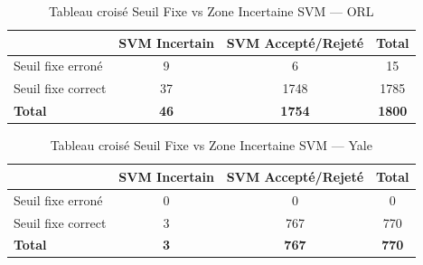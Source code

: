 \begin{table}[h]
\centering
\caption{Tableau croisé Seuil Fixe vs Zone Incertaine SVM --- ORL}
\label{tab:cross_orl}
\begin{tabular}{lccc}
\hline
\textbf{} & \textbf{SVM Incertain} & \textbf{SVM Accepté/Rejeté} & \textbf{Total} \\
\hline
Seuil fixe erroné    & 9 & 6 & 15 \\
Seuil fixe correct   & 37 & 1748 & 1785 \\
\hline
\textbf{Total}    & \textbf{46} & \textbf{1754} & \textbf{1800} \\
\hline
\end{tabular}
\end{table}

\begin{table}[h]
\centering
\caption{Tableau croisé Seuil Fixe vs Zone Incertaine SVM --- Yale}
\label{tab:cross_yale}
\begin{tabular}{lccc}
\hline
\textbf{} & \textbf{SVM Incertain} & \textbf{SVM Accepté/Rejeté} & \textbf{Total} \\
\hline
Seuil fixe erroné    & 0 & 0 & 0 \\
Seuil fixe correct   & 3 & 767 & 770 \\
\hline
\textbf{Total}    & \textbf{3} & \textbf{767} & \textbf{770} \\
\hline
\end{tabular}
\end{table}